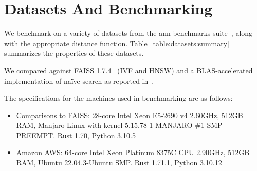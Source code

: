 
\section{Datasets And Benchmarking}
\label{sec:datasets-and-distance-functions}


We benchmark on a variety of datasets from the ann-benchmarks suite~\cite{Aumller2018ANNBenchmarksAB}, 
along with the appropriate distance function.
Table~\ref{table:datasets:summary} summarizes the properties of these datasets.

We compared against FAISS 1.7.4~\cite{johnson2019billion} (IVF and HNSW) and a BLAS-accelerated implementation of na\"ive search as reported in~\cite{johnson2019billion}.

The specifications for the machines used in benchmarking are as follows:



\begin{itemize}
\item Comparisons to FAISS: 28-core Intel Xeon E5-2690 v4 2.60GHz, 512GB RAM, Manjaro Linux with kernel 5.15.78-1-MANJARO \#1 SMP PREEMPT. Rust 1.70, Python 3.10.5
\item Amazon AWS: 64-core Intel Xeon Platinum 8375C CPU 2.90GHz, 512GB RAM, Ubuntu 22.04.3-Ubuntu SMP. Rust 1.71.1, Python 3.10.12
\end{itemize}




